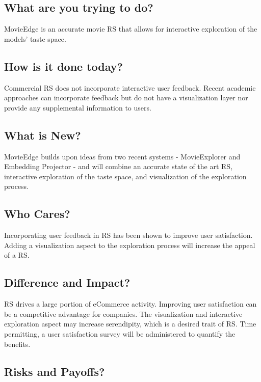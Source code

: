\subsection{What are you trying to do?} 

MovieEdge is an accurate movie RS that allows for interactive exploration of the models’ taste space. 

\subsection{How is it done today?}

Commercial RS does not incorporate interactive user feedback. Recent academic approaches can incorporate feedback but do not have a visualization layer nor provide any supplemental information to users.  

\subsection{What is New?}

MovieEdge builds upon ideas from two recent systems - MovieExplorer and Embedding Projector - and will combine an accurate state of the art RS, interactive exploration of the taste space, and visualization of the exploration process.  

\subsection{Who Cares?}

Incorporating user feedback in RS has been shown to improve user satisfaction. Adding a visualization aspect to the exploration process will increase the appeal of a RS. 

\subsection{Difference and Impact?}

RS drives a large portion of eCommerce activity. Improving user satisfaction can be a competitive advantage for companies. The visualization and interactive exploration aspect may increase serendipity, which is a desired trait of RS. Time permitting, a user satisfaction survey will be administered to quantify the benefits. 

\subsection{Risks and Payoffs?}

